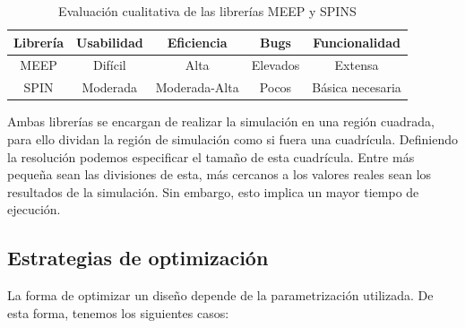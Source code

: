 \begin{table}[ht]
    \centering
    \begin{tabular}{|c|c|c|c|c|}
    \hline 
    Librería &  Usabilidad & Eficiencia & Bugs & Funcionalidad \\
    \hline 
    MEEP &  Difícil & Alta & Elevados & Extensa \\
    SPIN &  Moderada  & Moderada-Alta & Pocos & Básica necesaria \\
    \hline 
    \end{tabular}
    \caption{Evaluación cualitativa de las librerías MEEP y SPINS}
    \label{tab:simulation}
\end{table}


Ambas librerías se encargan de realizar la simulación en una región cuadrada, para ello dividan la región de simulación como si fuera una cuadrícula.
Definiendo la resolución podemos especificar el tamaño de esta cuadrícula. 
Entre más pequeña sean las divisiones de esta, más cercanos a los valores reales sean los resultados de la simulación.
Sin embargo, esto implica un mayor tiempo de ejecución.


\subsection{Estrategias de optimización}

La forma de optimizar un diseño depende de la parametrización utilizada. De esta forma, tenemos los siguientes casos:

